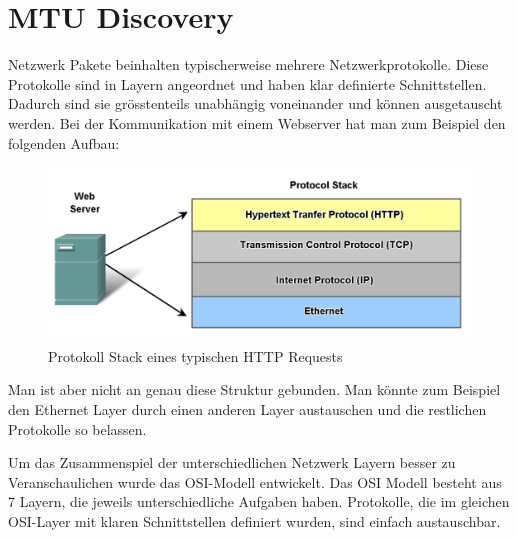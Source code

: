 \cleardoublepage
\section{MTU Discovery}

Netzwerk Pakete beinhalten typischerweise mehrere Netzwerkprotokolle. Diese Protokolle sind in Layern angeordnet und haben klar definierte Schnittstellen. Dadurch sind sie grösstenteils unabhängig voneinander und können ausgetauscht werden. Bei der Kommunikation mit einem Webserver hat man zum Beispiel den folgenden Aufbau\footnotemark[1]:

\begin{figure}[H]
    \begin{center}
        \includegraphics[trim=1 0 0 0,clip,width=\textwidth]{mainpart/analyse/img/HTTP_Stack}
    \end{center}
    \caption{Protokoll Stack eines typischen HTTP Requests}
\end{figure}


Man ist aber nicht an genau diese Struktur gebunden. Man könnte zum Beispiel den Ethernet Layer durch einen anderen Layer austauschen und die restlichen Protokolle so belassen.

Um das Zusammenspiel der unterschiedlichen Netzwerk Layern besser zu Veranschaulichen wurde das \ac{OSI}-Modell entwickelt. Das OSI Modell besteht aus 7 Layern, die jeweils unterschiedliche Aufgaben haben. Protokolle, die im gleichen \ac{OSI}-Layer mit klaren Schnittstellen definiert wurden, sind einfach austauschbar.

